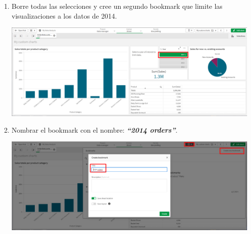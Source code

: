 \documentclass[12pt,letterpaper]{article}
\newcommand\tab[1][1cm]{\hspace*{#1}}
\begin{document}
\begin{enumerate}[\tab 1.]
        \item Borre todas las selecciones y cree un segundo bookmark que limite las visualizaciones a los datos de 2014.
        \begin{center}
            \includegraphics[width=13cm]{./img/img41.png}
        \end{center}
        \item Nombrar el bookmark con el nombre: \textit{\textbf{“2014 orders”}}.
        \begin{center}
            \includegraphics[width=13cm]{./img/img42.png}
        \end{center}
    \end{enumerate}
\end{document}
